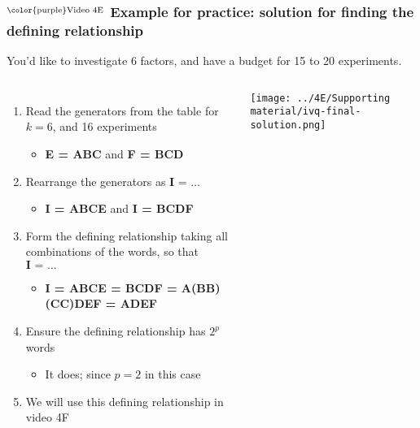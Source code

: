 \begin{frame}\frametitle{$^\text{\color{purple}Video 4E}$ Example for practice: {\color{myOrange}solution} for finding the defining relationship}
	
	\vspace{0.5cm}
	You'd like to investigate 6 factors, and have a budget for 15 to 20 experiments.
	
	\vspace{0.5cm}
	\begin{columns}[T]
			\begin{enumerate}
				\item	Read the generators from the table for $k=6$, and 16 experiments
					\begin{itemize}
						\item	\textbf{E = ABC}	and  \textbf{F = BCD}
					\end{itemize}
				\item	Rearrange the generators as  $\textbf{I = \ldots}$
					\begin{itemize}
						\item	\textbf{I = ABCE}	and  \textbf{I = BCDF}
					\end{itemize}
			 	\item	Form the {\color{purple}defining relationship} taking all combinations of the words, so that $\textbf{I = \ldots}$
					\begin{itemize}
						\item	\textbf{I = ABCE = BCDF = A(BB)(CC)DEF = ADEF}
					\end{itemize}
			 	\item	Ensure the defining relationship has $2^p$ words
					\begin{itemize}
						\item	It does; since $p=2$ in this case
					\end{itemize} 
				\item	We will use this defining relationship in video 4F
			\end{enumerate}
			
			\centerline{\texttt{[image: ../4E/Supporting material/ivq-final-solution.png]}}

	\end{columns}

	
\end{frame}

